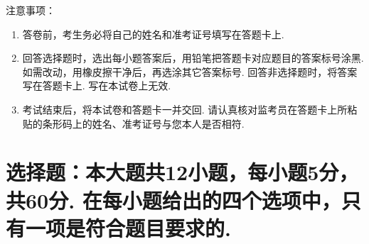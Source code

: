 \documentclass[12pt,space]{ctexart} %
\begin{document}
\juemi%
{\heiti 注意事项}：
\begin{enumerate}[itemsep=-0.3em,topsep=0pt]
\item 答卷前，考生务必将自己的姓名和准考证号填写在答题卡上. 
\item 回答选择题时，选出每小题答案后，用铅笔把答题卡对应题目的答案标号涂黑. 如需改动，用橡皮擦干净后，再选涂其它答案标号. 回答非选择题时，将答案写在答题卡上. 写在本试卷上无效. 
\item 考试结束后，将本试卷和答题卡一并交回. 
	请认真核对监考员在答题卡上所粘贴的条形码上的姓名、准考证号与您本人是否相符. 
\end{enumerate}

\section{选择题：本大题共12小题，每小题5分，共60分. 在每小题给出的四个选项中，只有一项是符合题目要求的. }
\end{document}

